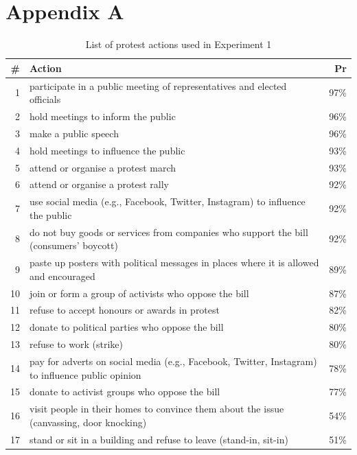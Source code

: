 \documentclass[12pt, letterpaper]{article}
\begin{document}
\endgroup

\newpage

\setcounter{table}{0}
\renewcommand{\thetable}{A\arabic{table}}

\begin{table}

\section{Appendix A}

\caption{List of protest actions used in Experiment 1}
\small
\begin{tabularx}{\linewidth}{rXr}
\addlinespace
\toprule
\# & Action & Pr\\
\midrule
1 & participate in a public meeting of representatives and elected officials & 97\%\\
2 & hold meetings to inform the public & 96\%\\
3 & make a public speech & 96\%\\
4 & hold meetings to influence the public & 93\%\\
5 & attend or organise a protest march & 93\%\\
6 & attend or organise a protest rally & 92\%\\
7 & use social media (e.g., Facebook, Twitter, Instagram) to influence the public & 92\%\\
8 & do not buy goods or services from companies who support the bill (consumers' boycott) & 92\%\\
9 & paste up posters with political messages in places where it is allowed and encouraged & 89\%\\
10 & join or form a group of activists who oppose the bill & 87\%\\
11 & refuse to accept honours or awards in protest & 82\%\\
12 & donate to political parties who oppose the bill & 80\%\\
13 & refuse to work (strike) & 80\%\\
14 & pay for adverts on social media (e.g., Facebook, Twitter, Instagram) to influence public opinion & 78\%\\
15 & donate to activist groups who oppose the bill & 77\%\\
16 & visit people in their homes to convince them about the issue (canvassing, door knocking) & 54\%\\
17 & stand or sit in a building and refuse to leave (stand-in, sit-in) & 51\%\\

\end{tabularx}
\end{table}
\end{document}
